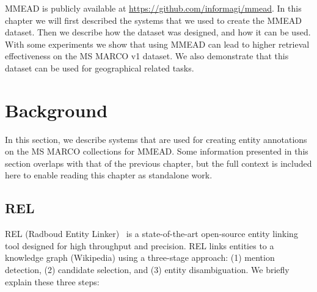 MMEAD is publicly available at \url{https://github.com/informagi/mmead}. In this chapter we will first described the systems that we used to create the MMEAD dataset. Then we describe how the dataset was designed, and how it can be used. With some experiments we show that using MMEAD can lead to higher retrieval effectiveness on the MS MARCO v1 dataset. We also demonstrate that this dataset can be used for geographical related tasks. 

\section{Background}
In this section, we describe systems that are used for creating entity annotations on the MS MARCO collections for MMEAD. Some information presented in this section overlaps with that of the previous chapter, but the full context is included here to enable reading this chapter as standalone work.

\subsection{REL}
REL (Radboud Entity Linker)~\citep{rel} is a state-of-the-art open-source entity linking tool designed for high throughput and precision. REL links entities to a knowledge graph (Wikipedia) using a three-stage approach: (1) mention detection, (2) candidate selection, and (3) entity disambiguation. We briefly explain these three steps:

